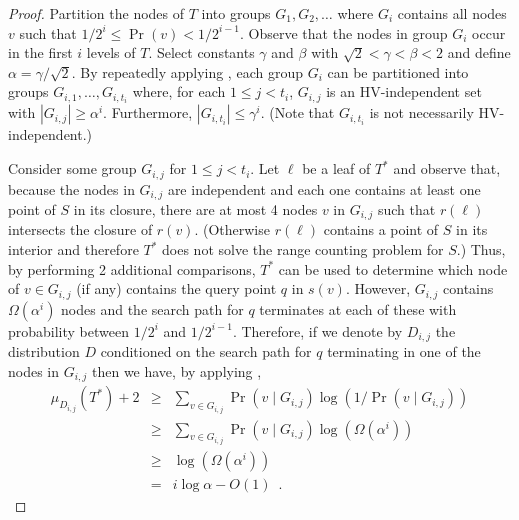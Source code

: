 \documentclass{patmorin}
\begin{document}
\begin{proof}
Partition the nodes of $T$ into groups $G_1,G_2,\ldots$ where $G_i$
contains all nodes $v$ such that $1/2^{i} \le \Pr(v) < 1/2^{i-1}$.
Observe that the nodes in group $G_i$ occur in the first $i$ levels of
$T$.  Select constants $\gamma$ and $\beta$ with $\sqrt{2} < \gamma
< \beta < 2$ and define $\alpha=\gamma/\sqrt{2}$.  By
repeatedly applying , each group $G_i$ can be
partitioned into groups $G_{i,1},\ldots,G_{i,t_i}$ where, for each $1
\le j < t_i$, $G_{i,j}$ is an HV-independent set with $|G_{i,j}|
\ge \alpha^i$.  Furthermore, $|G_{i,t_i}| \le \gamma^i$. (Note that
$G_{i,t_i}$ is not necessarily HV-independent.)

Consider some group $G_{i,j}$ for $1\le j < t_i$.  Let $\ell$ be a
leaf of $T^*$ and observe that, because the nodes in $G_{i,j}$ are
independent and each one contains at least one point of $S$ in its
closure, there are at most 4 nodes $v$ in $G_{i,j}$ such that
$r(\ell)$ intersects the closure of $r(v)$.  (Otherwise $r(\ell)$
contains a point of $S$ in its interior and therefore $T^*$ does not
solve the range counting problem for $S$.) Thus, by performing 2 
additional comparisons, $T^*$ can be used to determine which node of
$v\in G_{i,j}$ (if any) contains the query point $q$ in $s(v)$.
However, $G_{i,j}$ contains $\Omega(\alpha^i)$ nodes and the search
path for $q$ terminates at each of these with probability between
$1/2^i$ and $1/2^{i-1}$.  Therefore, if we denote by $D_{i,j}$ the
distribution $D$ conditioned on the search path for $q$ terminating in
one of the nodes in $G_{i,j}$ then we have, by applying
,
\begin{eqnarray*}
   \mu_{D_{i,j}}(T^*) + 2 
    & \ge & \sum_{v\in G_{i,j}}\Pr(v\mid G_{i,j})\log(1/\Pr(v\mid G_{i,j})) \\
    & \ge & \sum_{v\in G_{i,j}}\Pr(v\mid G_{i,j})\log(\Omega(\alpha^i)) \\
    & \ge & \log(\Omega(\alpha^i)) \\
    & = & i\log\alpha - O(1) \enspace .
\end{eqnarray*}


\end{proof}
\end{document}
